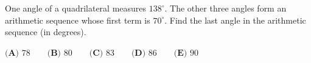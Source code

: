 One angle of a quadrilateral measures $138^\circ$. The other three angles form an arithmetic sequence whose first term is $70^\circ$. Find the last angle in the arithmetic sequence (in degrees).

$\textbf{(A) }78\qquad\textbf{(B) }80\qquad\textbf{(C) }83\qquad\textbf{(D) }86\qquad\textbf{(E) }90$
